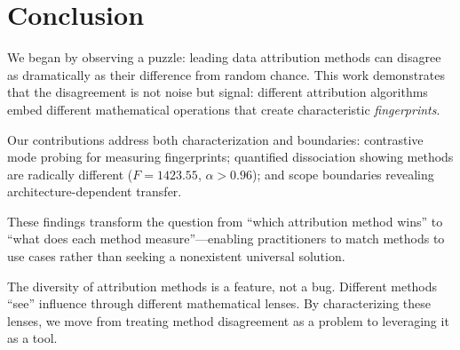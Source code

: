 \section{Conclusion}

We began by observing a puzzle: leading data attribution methods can disagree as dramatically as their difference from random chance. This work demonstrates that the disagreement is not noise but signal: different attribution algorithms embed different mathematical operations that create characteristic \emph{fingerprints}.

Our contributions address both characterization and boundaries: contrastive mode probing for measuring fingerprints; quantified dissociation showing methods are radically different ($F=1423.55$, $\alpha > 0.96$); and scope boundaries revealing architecture-dependent transfer.

These findings transform the question from ``which attribution method wins'' to ``what does each method measure''---enabling practitioners to match methods to use cases rather than seeking a nonexistent universal solution.

The diversity of attribution methods is a feature, not a bug. Different methods ``see'' influence through different mathematical lenses. By characterizing these lenses, we move from treating method disagreement as a problem to leveraging it as a tool.
